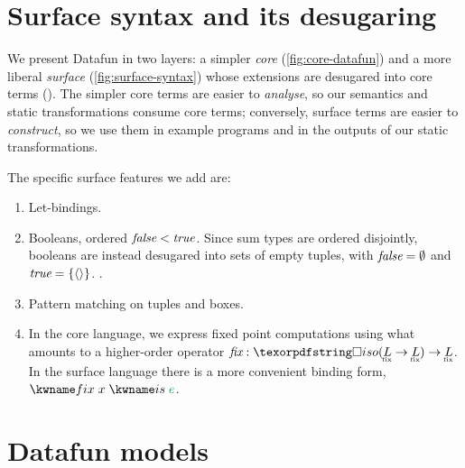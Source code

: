 







\section{Surface syntax and its desugaring}

We present Datafun in two layers: a simpler \emph{core}
(\cref{fig:core-datafun}) and a more liberal \emph{surface}
(\cref{fig:surface-syntax}) whose extensions are desugared into core terms
().
%
The simpler core terms are easier to \emph{analyse}, so our semantics and static
transformations consume core terms; conversely, surface terms are easier to
\emph{construct}, so we use them in example programs and in the outputs of our
static transformations.

The specific surface features we add are:
\begin{enumerate}
\item Let-bindings.

\item Booleans, ordered $\textmd{\itshape false} < \textmd{\itshape true}$. Since sum types are ordered
  disjointly, booleans are instead desugared into sets of empty tuples, with
  $\textmd{\itshape false} = \emptyset$ and $\textmd{\itshape true} = \{{\langle{}\rangle}\}$. .

\item Pattern matching on tuples and boxes. 


\item In the core language, we express fixed point computations using what
  amounts to a higher-order operator $\prim{fix} : \isof{(\fixt L \to \fixt L)}
  \to \fixt L$. In the surface language there is a more convenient binding form,
  $\efixisd x e$.

\end{enumerate}


\section{Datafun models}
\label{sec:datafun-models}

